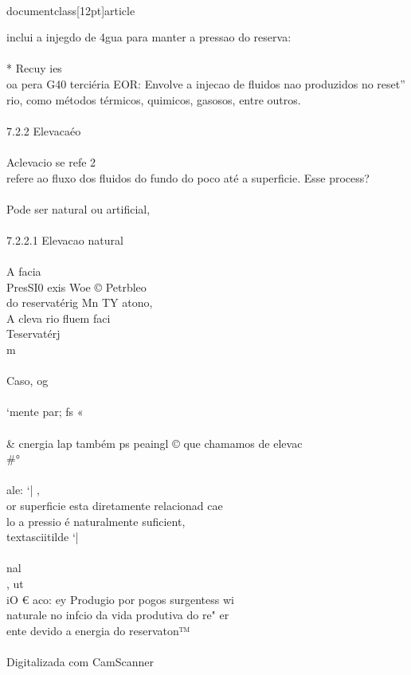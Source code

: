 \\documentclass[12pt]{article}
\begin{document}
inclui a injegdo de 4gua para manter a pressao do reserva:\\
\\
* Recuy ies\\
oa pera G40 terciéria EOR: Envolve a injecao de fluidos nao produzidos no reset”\\
rio, como métodos térmicos, quimicos, gasosos, entre outros.\\
\\
7.2.2 Elevacaéo\\
\\
Aclevacio se refe 2\\
refere ao fluxo dos fluidos do fundo do poco até a superficie. Esse process?\\
\\
Pode ser natural ou artificial,\\
\\
7.2.2.1 Elevacao natural\\
\\
A facia\\
PresSI0 exis Woe © Petrbleo\\
do reservatérig Mn TY atono,\\
A cleva rio fluem faci\\
Teservatérj\\
m\\
\\
Caso, og\\
\\
‘mente par; fs «\\
\\& cnergia lap também ps peaingl © que chamamos de elevac\\#°\\
\\
ale: ‘| ,\\
or superficie esta diretamente relacionad cae\\
lo a pressio é naturalmente suficient, \\textasciitilde{} ‘|\\
\\
nal\\
, ut\\
iO € aco: ey Produgio por pogos surgentess wi\\
naturale no infcio da vida produtiva do re" er\\
ente devido a energia do reservaton™\\
\\
Digitalizada com CamScanner\\
\end{document}
